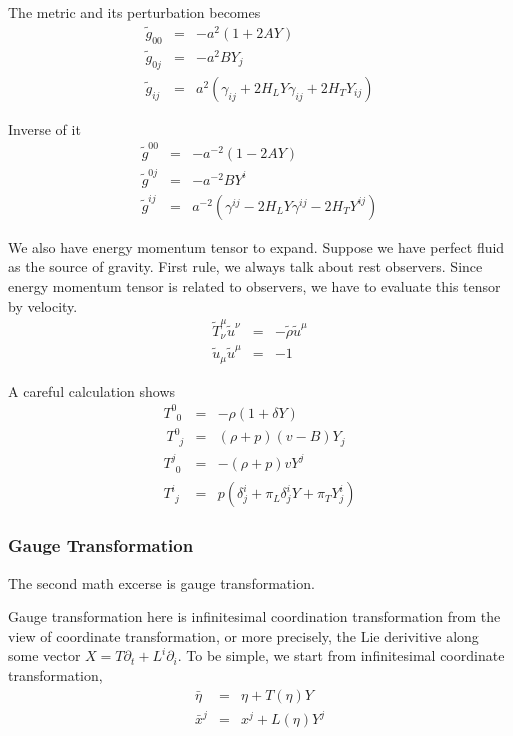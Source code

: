 \documentclass[12pt,a4paper]{book}
\begin{document}
The metric and its perturbation becomes
\begin{eqnarray}
\tilde g_{00} &=&	-a^2( 1 + 2 A Y) \\
\tilde g_{0j} &=& -a^2 B Y_j \\
\tilde g_{ij} &=& a^2(\gamma_{ij} + 2 H_L Y \gamma_{ij} + 2 H_T Y_{ij})
\end{eqnarray}

Inverse of it
\begin{eqnarray}
\tilde g^{00}&=& -a^{-2}(1-2A Y) \\
\tilde g^{0j}&=& -a^{-2} B Y^i \\
\tilde g^{ij}&=& a^{-2}(\gamma^{ij}-2H_L Y \gamma^{ij}-2H_T Y^{ij} )
\end{eqnarray}


We also have energy momentum tensor to expand. Suppose we have perfect fluid as the source of gravity. First rule, we always talk about rest observers. Since energy momentum tensor is related to observers, we have to evaluate this tensor by velocity.
\begin{eqnarray}
	\tilde T^\mu_\nu \tilde u^\nu &=& -\tilde \rho \tilde u^\mu \\
	\tilde u_\mu \tilde u^\mu &=& -1
\end{eqnarray}

A careful calculation shows 
\begin{eqnarray}
T^0_{\phantom 0 0} &=& -\rho (1+\delta Y)  \\\
T^0_{\phantom 0j } &=& (\rho + p )(v-B)Y_j \\
T^j_{\phantom j0 }&=& -(\rho + p) v Y^j \\
T^{i}_{\phantom i j} &=& p(\delta^i_j + \pi_L \delta^i_j Y +\pi_T Y^i_j)
\end{eqnarray}








\subsubsection{Gauge Transformation}

The second math excerse is gauge transformation.

Gauge transformation here is infinitesimal coordination transformation from the view of coordinate transformation, or more precisely, the Lie derivitive along some vector $X=T\partial_t+L^i\partial_i$. To be simple, we start from infinitesimal coordinate transformation,
\begin{eqnarray}
	\bar\eta &=& \eta + T(\eta) Y \\
	\bar x^j &=& x^j + L(\eta) Y^j
\end{eqnarray}
\end{document}
